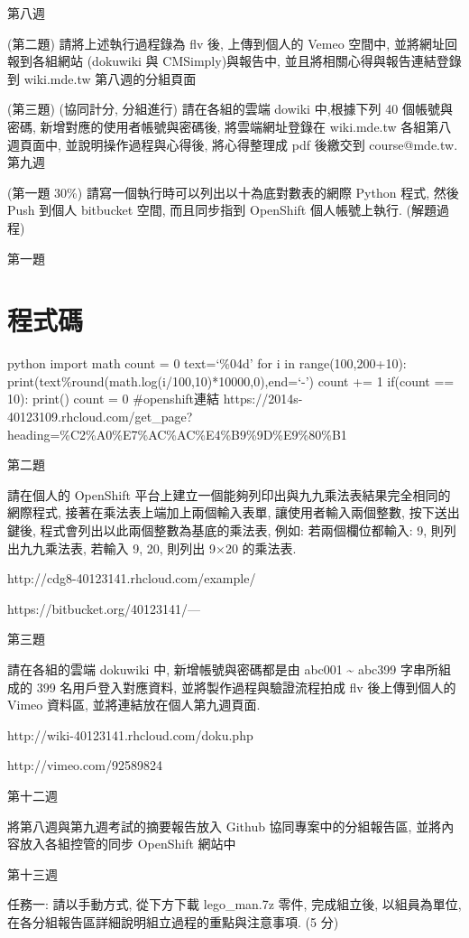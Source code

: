 \documentclass[]{article}
\begin{document}
第八週

(第二題) 請將上述執行過程錄為 flv 後, 上傳到個人的 Vemeo 空間中,
並將網址回報到各組網站 (dokuwiki 與 CMSimply)與報告中,
並且將相關心得與報告連結登錄到 wiki.mde.tw 第八週的分組頁面

(第三題) (協同計分, 分組進行) 請在各組的雲端 dowiki 中,根據下列 40
個帳號與密碼, 新增對應的使用者帳號與密碼後, 將雲端網址登錄在 wiki.mde.tw
各組第八週頁面中, 並說明操作過程與心得後, 將心得整理成 pdf 後繳交到
course@mde.tw. 第九週

(第一題 30\%) 請寫一個執行時可以列出以十為底對數表的網際 Python 程式,
然後 Push 到個人 bitbucket 空間, 而且同步指到 OpenShift 個人帳號上執行.
(解題過程)

第一題

\section{程式碼}\label{ux7a0bux5f0fux78bc}

python import math count = 0 text=`\%04d' for i in range(100,200+10):
print(text\%round(math.log(i/100,10)*10000,0),end=`-') count += 1
if(count == 10): print() count = 0 \#openshift連結
https://2014s-40123109.rhcloud.com/get\_page?heading=\%C2\%A0\%E7\%AC\%AC\%E4\%B9\%9D\%E9\%80\%B1

第二題

請在個人的 OpenShift
平台上建立一個能夠列印出與九九乘法表結果完全相同的網際程式,
接著在乘法表上端加上兩個輸入表單, 讓使用者輸入兩個整數, 按下送出鍵後,
程式會列出以此兩個整數為基底的乘法表, 例如: 若兩個欄位都輸入: 9,
則列出九九乘法表, 若輸入 9, 20, 則列出 9×20 的乘法表.

http://cdg8-40123141.rhcloud.com/example/

https://bitbucket.org/40123141/---

第三題

請在各組的雲端 dokuwiki 中, 新增帳號與密碼都是由 abc001
\textasciitilde{} abc399 字串所組成的 399 名用戶登入對應資料,
並將製作過程與驗證流程拍成 flv 後上傳到個人的 Vimeo 資料區,
並將連結放在個人第九週頁面.

http://wiki-40123141.rhcloud.com/doku.php

http://vimeo.com/92589824

第十二週

將第八週與第九週考試的摘要報告放入 Github 協同專案中的分組報告區,
並將內容放入各組控管的同步 OpenShift 網站中

第十三週

任務一: 請以手動方式, 從下方下載 lego\_man.7z 零件, 完成組立後,
以組員為單位, 在各分組報告區詳細說明組立過程的重點與注意事項. (5 分)
\end{document}
